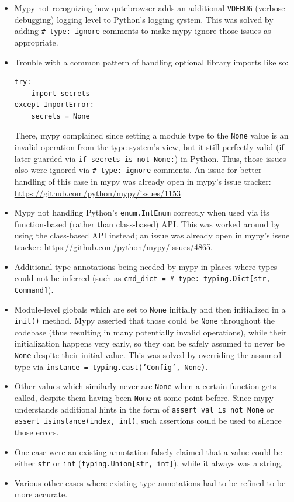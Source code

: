 \documentclass[a4paper,parskip=full,DIV=14,BCOR=15mm]{scrreprt}
\newcommand{\py}[1]{\texttt{#1}}
\begin{document}
\begin{itemize}
  \item Mypy not recognizing how qutebrowser adds an additional \verb|VDEBUG|
    (verbose debugging) logging level to Python's logging system. This was
    solved by adding \py{# type: ignore} comments to make mypy ignore those
    issues as appropriate.
  \item Trouble with a common pattern of handling optional library imports like so:
    \begin{verbatim}
try:
    import secrets
except ImportError:
    secrets = None
\end{verbatim}
    There, mypy complained since setting a module type to the
    \verb|None| value is an invalid operation from the type system's view, but
    it still perfectly valid (if later guarded via \py{if secrets is not None:})
    in Python. Thus, those issues also were ignored via \py{# type: ignore}
    comments. An issue for better handling of this case in mypy was already
    open in mypy's issue tracker: \url{https://github.com/python/mypy/issues/1153}
  \item Mypy not handling Python's \py{enum.IntEnum} correctly when used via
    its function-based (rather than class-based) API. This was worked around by
    using the class-based API instead; an issue was already open in mypy's issue
    tracker: \url{https://github.com/python/mypy/issues/4865}.
  \item Additional type annotations being needed by mypy in places where types
    could not be inferred (such as \texttt{cmd_dict = {} # type: typing.Dict[str, Command]}).
  \item Module-level globals which are set to \py{None} initially and then
    initialized in a \py{init()} method. Mypy asserted that those could be \py{None}
    throughout the codebase (thus resulting in many potentially invalid operations),
    while their initialization happens very early, so they can be safely assumed
    to never be \py{None} despite their initial value. This was solved by
    overriding the assumed type via \py{instance = typing.cast('Config', None)}.
  \item Other values which similarly never are \py{None} when a certain function
    gets called, despite them having been \py{None} at some point before. Since
    mypy understands additional hints in the form of \py{assert val is not
      None} or \py{assert isinstance(index, int)}, such assertions could be used
    to silence those errors.
  \item One case were an existing annotation falsely claimed that a value could
    be either \py{str} or \py{int} (\py{typing.Union[str, int]}), while it
    always was a string.
  \item Various other cases where existing type annotations had to be refined to
    be more accurate.
\end{itemize}
\end{document}

